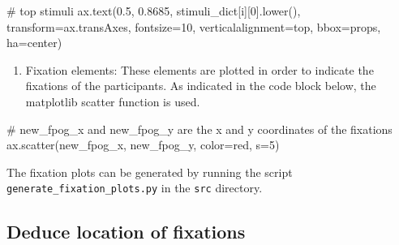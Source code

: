 \documentclass[
  a4paper,
]{article}
\newenvironment{Shaded}{}{}
\newcommand{\CommentTok}[1]{\textcolor[rgb]{0.42,0.45,0.49}{#1}}
\newcommand{\DecValTok}[1]{\textcolor[rgb]{0.00,0.36,0.77}{#1}}
\newcommand{\FloatTok}[1]{\textcolor[rgb]{0.00,0.36,0.77}{#1}}
\newcommand{\NormalTok}[1]{\textcolor[rgb]{0.14,0.16,0.18}{#1}}
\newcommand{\OperatorTok}[1]{\textcolor[rgb]{0.14,0.16,0.18}{#1}}
\newcommand{\StringTok}[1]{\textcolor[rgb]{0.01,0.18,0.38}{#1}}
\providecommand{\tightlist}{%
  \setlength{\itemsep}{0pt}\setlength{\parskip}{0pt}}\usepackage{longtable,booktabs,array}
\begin{document}
\begin{Shaded}
\begin{Highlighting}[]
\CommentTok{\# top stimuli}
\NormalTok{ax.text(}\FloatTok{0.5}\NormalTok{, }\FloatTok{0.8685}\NormalTok{, stimuli\_dict[i][}\DecValTok{0}\NormalTok{].lower(), transform}\OperatorTok{=}\NormalTok{ax.transAxes, fontsize}\OperatorTok{=}\DecValTok{10}\NormalTok{,}
\NormalTok{    verticalalignment}\OperatorTok{=}\StringTok{\textquotesingle{}top\textquotesingle{}}\NormalTok{, bbox}\OperatorTok{=}\NormalTok{props, ha}\OperatorTok{=}\StringTok{\textquotesingle{}center\textquotesingle{}}\NormalTok{)}
\end{Highlighting}
\end{Shaded}

\begin{enumerate}
\def\labelenumi{\arabic{enumi}.}
\setcounter{enumi}{1}
\tightlist
\item
  Fixation elements: These elements are plotted in order to indicate the
  fixations of the participants. As indicated in the code block below,
  the matplotlib scatter function is used.
\end{enumerate}

\begin{Shaded}
\begin{Highlighting}[]
\CommentTok{\# new\_fpog\_x and new\_fpog\_y are the x and y coordinates of the fixations}
\NormalTok{ax.scatter(new\_fpog\_x, new\_fpog\_y, color}\OperatorTok{=}\StringTok{\textquotesingle{}red\textquotesingle{}}\NormalTok{, s}\OperatorTok{=}\DecValTok{5}\NormalTok{)}
\end{Highlighting}
\end{Shaded}

\begin{tcolorbox}[enhanced jigsaw, colback=white, colbacktitle=quarto-callout-note-color!10!white, titlerule=0mm, opacitybacktitle=0.6, left=2mm, toptitle=1mm, leftrule=.75mm, opacityback=0, breakable, bottomrule=.15mm, colframe=quarto-callout-note-color-frame, rightrule=.15mm, coltitle=black, bottomtitle=1mm, toprule=.15mm, title=\textcolor{quarto-callout-note-color}{\faInfo}\hspace{0.5em}{Nota Bene}, arc=.35mm]

The fixation plots can be generated by running the script
\texttt{generate\_fixation\_plots.py} in the \texttt{src} directory.

\end{tcolorbox}

\hypertarget{deduce-location-of-fixations}{%
\subsection{Deduce location of
fixations}\label{deduce-location-of-fixations}}
\end{document}
